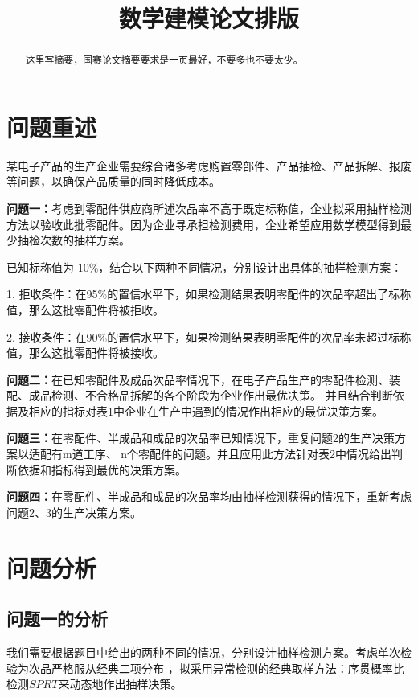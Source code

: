 \documentclass[withoutpreface,bwprint]{cumcmthesis} %
\title{数学建模论文排版}
\begin{document}
\maketitle
\begin{abstract}

	这里写摘要，国赛论文摘要要求是一页最好，不要多也不要太少。

\end{abstract}


\section{问题重述}
某电子产品的生产企业需要综合诸多考虑购置零部件、产品抽检、产品拆解、报废等问题，以确保产品质量的同时降低成本。

\textbf{问题一：}考虑到零配件供应商所述次品率不高于既定标称值，企业拟采用抽样检测方法以验收此批零配件。因为企业寻承担检测费用，企业希望应用数学模型得到最少抽检次数的抽样方案。

已知标称值为 10\%，结合以下两种不同情况，分别设计出具体的抽样检测方案：

1. 拒收条件：在95\%的置信水平下，如果检测结果表明零配件的次品率超出了标称值，那么这批零配件将被拒收。

2. 接收条件：在90\%的置信水平下，如果检测结果表明零配件的次品率未超过标称值，那么这批零配件将被接收。

\textbf{问题二：}在已知零配件及成品次品率情况下，在电子产品生产的零配件检测、装配、成品检测、不合格品拆解的各个阶段为企业作出最优决策。
并且结合判断依据及相应的指标对表1中企业在生产中遇到的情况作出相应的最优决策方案。

\textbf{问题三：}在零配件、半成品和成品的次品率已知情况下，重复问题2的生产决策方案以适配有m道工序、
n个零配件的问题。并且应用此方法针对表2中情况给出判断依据和指标得到最优的决策方案。

\textbf{问题四：}在零配件、半成品和成品的次品率均由抽样检测获得的情况下，重新考虑问题2、3的生产决策方案。
\section{问题分析}
\subsection{问题一的分析}
我们需要根据题目中给出的两种不同的情况，分别设计抽样检测方案。考虑单次检验为次品严格服从经典二项分布
，拟采用异常检测的经典取样方法：序贯概率比检测$SPRT$来动态地作出抽样决策。
\end{document}
